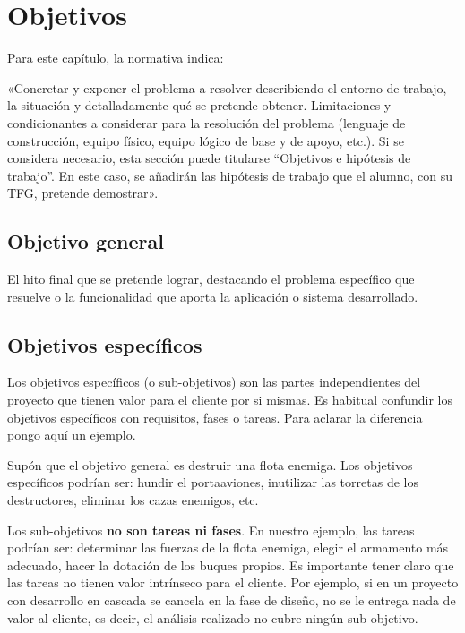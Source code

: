 \chapter{Objetivos}
\label{chap:objetivos}

\noindent
Para este capítulo, la normativa indica:

«Concretar y exponer el problema a resolver describiendo el entorno de trabajo,
la situación y detalladamente qué se pretende obtener. Limitaciones y
condicionantes a considerar para la resolución del problema (lenguaje de
construcción, equipo físico, equipo lógico de base y de apoyo, etc.). Si se
considera necesario, esta sección puede titularse ``Objetivos e hipótesis de
trabajo''. En este caso, se añadirán las hipótesis de trabajo que el alumno, con
su TFG, pretende demostrar».

\section{Objetivo general}

El hito final que se pretende lograr, destacando el problema específico que
resuelve o la funcionalidad que aporta la aplicación o sistema desarrollado.


\section{Objetivos específicos}

Los objetivos específicos (o sub-objetivos) son las partes independientes del
proyecto que tienen valor para el cliente por si mismas. Es habitual confundir
los objetivos específicos con requisitos, fases o tareas. Para aclarar la
diferencia pongo aquí un ejemplo.

Supón que el objetivo general es destruir una flota enemiga. Los
objetivos específicos podrían ser: hundir el portaaviones, inutilizar las
torretas de los destructores, eliminar los cazas enemigos, etc.

Los sub-objetivos \textbf{no son tareas ni fases}.  En nuestro ejemplo, las
tareas podrían ser: determinar las fuerzas de la flota enemiga, elegir el
armamento más adecuado, hacer la dotación de los buques propios. Es importante
tener claro que las tareas no tienen valor intrínseco para el cliente. Por
ejemplo, si en un proyecto con desarrollo en cascada se cancela en la fase de
diseño, no se le entrega nada de valor al cliente, es decir, el análisis
realizado no cubre ningún sub-objetivo.

